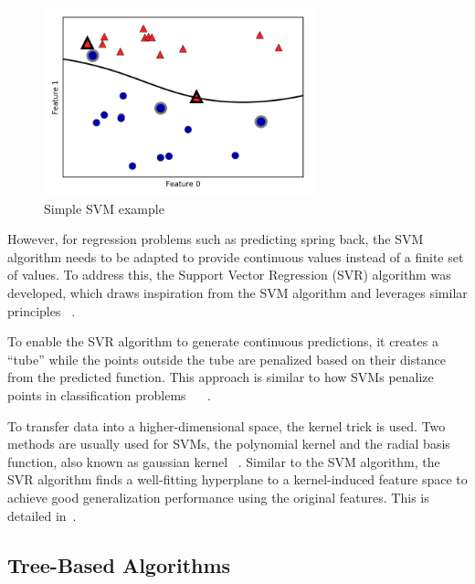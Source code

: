 \begin{figure}[H]
    \begin{tcolorbox}[arc=0pt,boxrule=0.5pt]
        \centering
        \includegraphics[width=0.7\textwidth]{chap4/images/svm_example}
    \end{tcolorbox}
    \caption{Simple \ac{SVM} example~\cite[p. 94]{muller2016introduction}}
    \label{fig:svm-example}
\end{figure}

However, for regression problems such as predicting spring back, the \ac{SVM} algorithm
needs to be adapted to provide continuous values instead of a finite set of values.
To address this, the Support Vector Regression (SVR) algorithm was developed, which draws inspiration from the
\ac{SVM} algorithm and leverages similar principles
~\cite[p. 92]{muller2016introduction}.

To enable the \ac{SVR} algorithm to generate continuous predictions, it creates a ``tube''
while the points outside the tube are penalized based on their distance from the
predicted function.
This approach is similar to how \ac{SVM}s penalize points in classification
problems
~\cite[p. 369]{montesinos2022support}
~\cite[pp. 67--68]{awad2015efficient}.

To transfer data into a higher-dimensional space, the kernel trick is used.
Two methods are usually used for \ac{SVM}s, the polynomial kernel and the radial basis
function, also known as gaussian kernel
~\cite[p. 97--98]{muller2016introduction}.
Similar to the \ac{SVM} algorithm, the \ac{SVR} algorithm finds a well-fitting hyperplane to a
kernel-induced feature space to achieve good generalization performance using the original
features.
This is detailed in~\cite[p. 369]{montesinos2022support}.

\subsection{Tree-Based Algorithms}\label{subsec:tree-based-algorithms}

